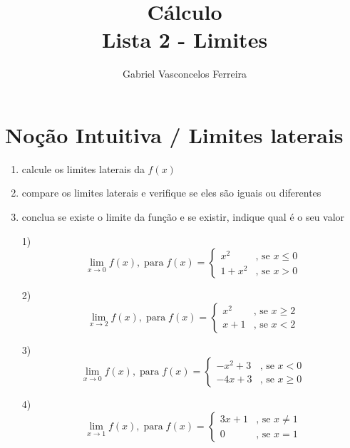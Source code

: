 \documentclass{jhwhw}
\title{Cálculo\\Lista 2 - Limites}
\author{Gabriel Vasconcelos Ferreira}
\begin{document}
\maketitle
\chapter{Noção Intuitiva / Limites laterais}
\begin{enumerate}
    \item calcule os limites laterais da $f(x)$
    \item compare os limites laterais e verifique se eles são iguais ou diferentes
    \item conclua se existe o limite da função e se existir, indique qual é o seu valor
\end{enumerate}
\begin{enumerate}
    \item [1)]$$
              \lim _{x \to 0} f(x), \operatorname{para} f(x)= \begin{cases}
                  x^2 & \text {, se } x \leq 0 \\ 1+x^2 & \text {, se } x>0
              \end{cases}$$
    \item [2)]$$
              \lim _{x \to 2} f(x), \operatorname{para} f(x)= \begin{cases}
                  x^2 & \text {, se } x \geq 2 \\ x+1 & \text {, se } x<2
              \end{cases}
          $$
    \item [3)]$$
              \lim _{x \to 0} f(x), \operatorname{para} f(x)= \begin{cases}
                  -x^2 + 3 & \text {, se } x < 0 \\ -4x + 3 & \text {, se } x\geq0
              \end{cases}
          $$
    \item [4)]$$
              \lim _{x \to 1} f(x), \operatorname{para} f(x)= \begin{cases}
                  3x+1 & \text {, se } x \neq 1 \\ 0 & \text {, se } x=1
              \end{cases}
          $$
\end{enumerate}
\newpage
{}
\end{document}
